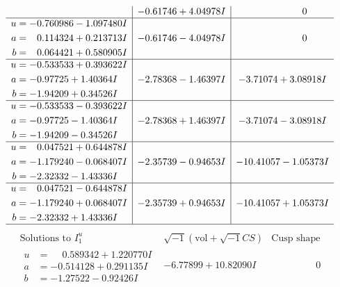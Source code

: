 \documentclass[1p]{elsarticle_modified}
\theoremstyle{definition}
\newcommand{\I}{\sqrt{-1}}
\begin{document}
$$\begin{array}{c|c|c}
 & -0.61746 + 4.04978 I & \phantom{-0.000000 } 0 \\ \hline\begin{aligned}
u &= -0.760986 - 1.097480 I \\
a &= \phantom{-}0.114324 + 0.213713 I \\
b &= \phantom{-}0.064421 + 0.580905 I\end{aligned}
 & -0.61746 - 4.04978 I & \phantom{-0.000000 } 0 \\ \hline\begin{aligned}
u &= -0.533533 + 0.393622 I \\
a &= -0.97725 + 1.40364 I \\
b &= -1.94209 + 0.34526 I\end{aligned}
 & -2.78368 - 1.46397 I & -3.71074 + 3.08918 I \\ \hline\begin{aligned}
u &= -0.533533 - 0.393622 I \\
a &= -0.97725 - 1.40364 I \\
b &= -1.94209 - 0.34526 I\end{aligned}
 & -2.78368 + 1.46397 I & -3.71074 - 3.08918 I \\ \hline\begin{aligned}
u &= \phantom{-}0.047521 + 0.644878 I \\
a &= -1.179240 - 0.068407 I \\
b &= -2.32332 - 1.43336 I\end{aligned}
 & -2.35739 - 0.94653 I & -10.41057 - 1.05373 I \\ \hline\begin{aligned}
u &= \phantom{-}0.047521 - 0.644878 I \\
a &= -1.179240 + 0.068407 I \\
b &= -2.32332 + 1.43336 I\end{aligned}
 & -2.35739 + 0.94653 I & -10.41057 + 1.05373 I\\
 \hline 
 \end{array}$$\newpage$$\begin{array}{c|c|c}  
\text{Solutions to }I^u_{1}& \I (\text{vol} + \sqrt{-1}CS) & \text{Cusp shape}\\
 \hline 
\begin{aligned}
u &= \phantom{-}0.589342 + 1.220770 I \\
a &= -0.514128 + 0.291135 I \\
b &= -1.27522 - 0.92426 I\end{aligned}
 & -6.77899 + 10.82090 I & \phantom{-0.000000 } 0 \\ \hline\begin{aligned}

\end{aligned}
\end{array}$$
\end{document}
